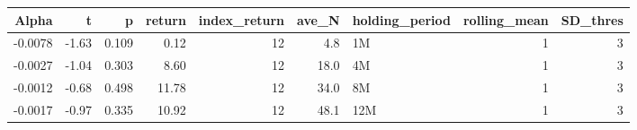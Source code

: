 \begin{table}[ht]
\centering
\begin{tabular}{rrrrrrlrr}
  \hline
Alpha & t & p & return & index\_return & ave\_N & holding\_period & rolling\_mean & SD\_thres \\ 
  \hline
-0.0078 & -1.63 & 0.109 & 0.12 & 12 & 4.8 & 1M &  1 &  3 \\ 
  -0.0027 & -1.04 & 0.303 & 8.60 & 12 & 18.0 & 4M &  1 &  3 \\ 
  -0.0012 & -0.68 & 0.498 & 11.78 & 12 & 34.0 & 8M &  1 &  3 \\ 
  -0.0017 & -0.97 & 0.335 & 10.92 & 12 & 48.1 & 12M &  1 &  3 \\ 
   \hline
\end{tabular}
\end{table}

